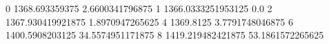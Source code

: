 0 1368.693359375 2.6600341796875
1 1366.0333251953125 0.0
2 1367.930419921875 1.8970947265625
4 1369.8125 3.7791748046875
6 1400.5908203125 34.5574951171875
8 1419.219482421875 53.1861572265625
